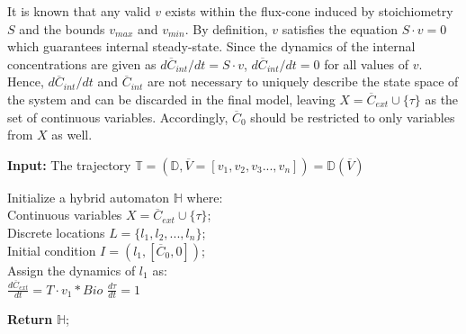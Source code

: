It is known that any valid $v$ exists within the flux-cone induced by stoichiometry $S$ and the bounds $v_{max}$ and $v_{min}$. By definition, $v$ satisfies the equation $S \cdot v = 0$ which guarantees internal steady-state. Since the dynamics of the internal concentrations are given as $d\overline{C}_{int}/dt = S \cdot v$, $d\overline{C}_{int}/dt = 0$ for all values of $v$. Hence, $d\overline{C}_{int}/dt$ and $\overline{C}_{int}$ are not necessary to uniquely describe the state space of the system and can be discarded in the final model, leaving $X = \overline{C}_{ext} \cup \{\tau\}$ as the set of continuous variables. Accordingly, $\overline{C}_{0}$ should be restricted to only variables from $X$ as well.
\begin{algorithm*}[H]
\SetAlgoLined
 \textbf{Input:} The trajectory $\mathbb{T} = (\mathbb{D},\overline{V} = [v_1, v_2, v_3..., v_n]) = \mathbb{D}(\overline{V})$\;

 Initialize a hybrid automaton $\mathbb{H}$ where:\\
 \hspace*{10mm}Continuous variables $X = \overline{C}_{ext} \cup \{ \tau \}$;\ \\
  \hspace*{10mm}Discrete locations $L = \{ l_1, l_2, ..., l_n \}$;\ \\
  \hspace*{10mm}Initial condition  $I = (l_1,[\overline{C}_{0}, 0])$;\ \\
 \hspace*{10mm}Assign the dynamics of $l_1$ as:\\
                        \hspace*{20mm}$\frac{d\overline{C}_{ext}}{dt} = T \cdot v_1 * Bio$\;
                        \hspace*{20mm}$\frac{d\tau}{dt} = 1$\;

 \textbf{Return} $\mathbb{H}$;\
 \caption{Transformation of dFBA trajectory $\mathbb{D}(\overline{V})$ to hybrid automaton $\mathbb{H}(\mathbb{D},\overline{V})$}
 \label{Algo1}
\end{algorithm*}

